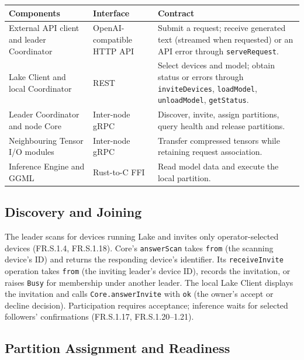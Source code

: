 \documentclass[12pt, titlepage]{article}
\begin{document}
\begin{center}
\small
\begin{tabularx}{\textwidth}{@{}>{\raggedright\arraybackslash}p{}>{\raggedright\arraybackslash}p{}>{\raggedright\arraybackslash}X@{}}
\toprule
\textbf{Components} & \textbf{Interface} & \textbf{Contract} \\
\midrule
External API client and leader Coordinator & OpenAI-compatible HTTP API &
Submit a request; receive generated text (streamed when requested) or an API
error through \texttt{serveRequest}. \\
Lake Client and local Coordinator & REST &
Select devices and model; obtain status or errors through
\texttt{inviteDevices}, \texttt{loadModel}, \texttt{unloadModel},
\texttt{getStatus}. \\
Leader Coordinator and node Core & Inter-node gRPC &
Discover, invite, assign partitions, query health and release partitions. \\
Neighbouring Tensor I/O modules & Inter-node gRPC &
Transfer compressed tensors while retaining request association. \\
Inference Engine and GGML & Rust-to-C FFI &
Read model data and execute the local partition. \\
\bottomrule
\end{tabularx}
\end{center}

\subsection{Discovery and Joining}

The leader scans for devices running Lake and invites only operator-selected
devices (FR.S.1.4, FR.S.1.18). Core's \texttt{answerScan} takes
\texttt{from} (the scanning device's ID) and returns the responding device's
identifier. Its \texttt{receiveInvite} operation takes \texttt{from}
(the inviting leader's device ID), records the invitation, or raises
\texttt{Busy} for membership under another leader. The local Lake Client
displays the invitation and calls \texttt{Core.answerInvite} with
\texttt{ok} (the owner's accept or decline decision). Participation requires acceptance; inference waits for
selected followers' confirmations (FR.S.1.17, FR.S.1.20--1.21).

\subsection{Partition Assignment and Readiness}
\end{document}
